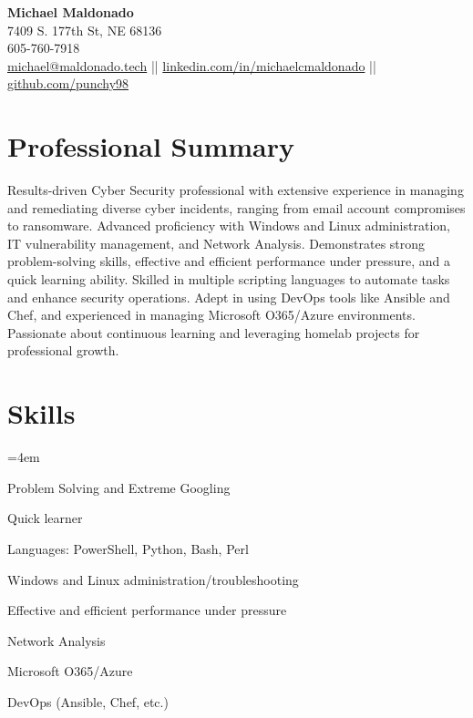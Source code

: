 \documentclass[a4paper,10pt]{article}
\begin{document}
\begin{center}
    \textbf{\LARGE Michael Maldonado} \\
    7409 S. 177th St, NE 68136 \\
    605-760-7918 \\
    \href{mailto:michael@maldonado.tech}{michael@maldonado.tech} ||
    \href{https://linkedin.com/in/michaelcmaldonado}{linkedin.com/in/michaelcmaldonado} ||
    \href{https://github.com/punchy98}{github.com/punchy98} 
\end{center}

\section*{Professional Summary}
Results-driven Cyber Security professional with extensive experience in managing and remediating diverse cyber incidents, ranging from email account compromises to ransomware. Advanced proficiency with Windows and Linux administration, IT vulnerability management, and Network Analysis. Demonstrates strong problem-solving skills, effective and efficient performance under pressure, and a quick learning ability. Skilled in multiple scripting languages to automate tasks and enhance security operations. Adept in using DevOps tools like Ansible and Chef, and experienced in managing Microsoft O365/Azure environments. Passionate about continuous learning and leveraging homelab projects for professional growth.
\section*{Skills}
\begin{itemize}
    \begin{multicols}{2}
    \small
    \leftskip=4em
    \item Problem Solving and Extreme Googling
    \item Quick learner
    \item Languages: PowerShell, Python, Bash, Perl
    \item Windows and Linux administration/troubleshooting
    \item Effective and efficient performance under pressure
    \item Network Analysis
    \item Microsoft O365/Azure
    \item DevOps (Ansible, Chef, etc.)
    \end{multicols}
\end{itemize}
\end{document}
